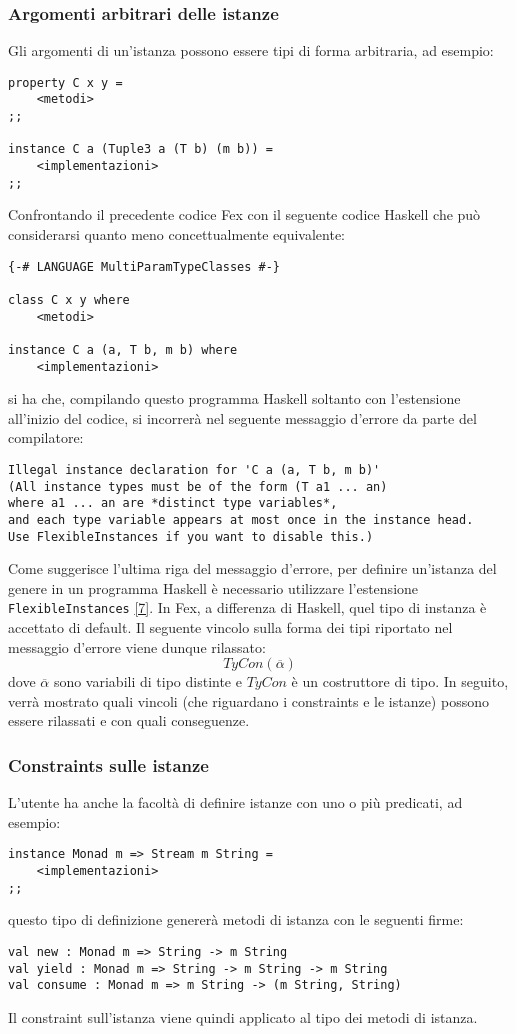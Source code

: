 \documentclass[10pt,a4paper]{article}
\begin{document}
\hypertarget{Argomenti arbitrari delle istanze}{\subsubsection{Argomenti arbitrari delle istanze}}
Gli argomenti di un'istanza possono essere tipi di forma arbitraria, ad esempio:
\begin{lstlisting}
property C x y =
    <metodi>
;;

instance C a (Tuple3 a (T b) (m b)) =
    <implementazioni>
;;
\end{lstlisting}
Confrontando il precedente codice Fex con il seguente codice Haskell che può considerarsi quanto meno concettualmente
equivalente:
\begin{lstlisting}
{-# LANGUAGE MultiParamTypeClasses #-}

class C x y where
    <metodi>

instance C a (a, T b, m b) where
    <implementazioni>
\end{lstlisting}
si ha che, compilando questo programma Haskell soltanto con l'estensione all'inizio del codice, si incorrerà nel
seguente messaggio d'errore da parte del compilatore:
\begin{lstlisting}
Illegal instance declaration for 'C a (a, T b, m b)'
(All instance types must be of the form (T a1 ... an)
where a1 ... an are *distinct type variables*,
and each type variable appears at most once in the instance head.
Use FlexibleInstances if you want to disable this.)
\end{lstlisting}
Come suggerisce l'ultima riga del messaggio d'errore, per definire un'istanza del genere in un programma Haskell è
necessario utilizzare l'estensione \texttt{FlexibleInstances} \hyperlink{bibl7}{[7]}. In Fex, a differenza di Haskell,
quel tipo di instanza
è accettato di default. Il seguente vincolo sulla forma dei tipi riportato nel messaggio d'errore viene dunque rilassato:
    \[ TyCon(\overline{\alpha}) \]
dove $ \overline{\alpha} $ sono variabili di tipo distinte e $ TyCon $ è un costruttore di tipo. In seguito, verrà
mostrato quali vincoli (che riguardano i constraints e le istanze) possono essere rilassati e con quali conseguenze.

\hypertarget{Constraints sulle istanze}{\subsubsection{Constraints sulle istanze}}
L'utente ha anche la facoltà di definire istanze con uno o più predicati, ad esempio:
\begin{lstlisting}
instance Monad m => Stream m String =
    <implementazioni>
;;
\end{lstlisting}
questo tipo di definizione genererà metodi di istanza con le seguenti firme:
\begin{lstlisting}
val new : Monad m => String -> m String
val yield : Monad m => String -> m String -> m String
val consume : Monad m => m String -> (m String, String)
\end{lstlisting}
Il constraint sull'istanza viene quindi applicato al tipo dei metodi di istanza.
\end{document}
